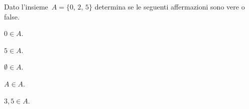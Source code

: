 \begin{esercizio}
\label{ese:5.15}
Dato l'insieme~$A = \{\text{0, 2, 5}\}$ determina se le seguenti affermazioni sono vere o false.
\TabPositions{2.5cm}
\begin{enumeratea}
\item $0\in A$. \tab\boxV\quad\boxF
\item $5\in A$. \tab\boxV\quad\boxF
\item $\emptyset \in A$. \tab\boxV\quad\boxF
\item $A\in A$. \tab\boxV\quad\boxF
\item $3,5\in A$. \tab\boxV\quad\boxF
\end{enumeratea}
\end{esercizio}

